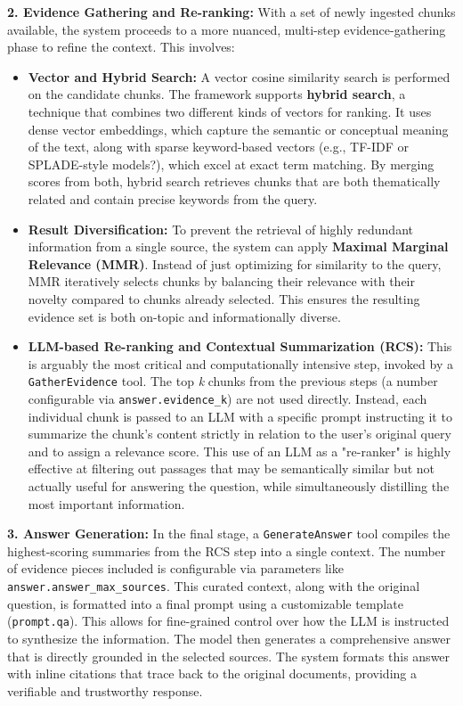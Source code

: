 \textbf{2. Evidence Gathering and Re-ranking:}
With a set of newly ingested chunks available, the system proceeds to a more nuanced, multi-step evidence-gathering phase to refine the context. This involves:
\begin{itemize}
    \item \textbf{Vector and Hybrid Search:} A vector cosine similarity search is performed on the candidate chunks. The framework supports \textbf{hybrid search}, a technique that combines two different kinds of vectors for ranking. It uses dense vector embeddings, which capture the semantic or conceptual meaning of the text, along with sparse keyword-based vectors (e.g., TF-IDF or SPLADE-style models?), which excel at exact term matching. By merging scores from both, hybrid search retrieves chunks that are both thematically related and contain precise keywords from the query. 
    \item \textbf{Result Diversification:} To prevent the retrieval of highly redundant information from a single source, the system can apply \textbf{Maximal Marginal Relevance (MMR)}. Instead of just optimizing for similarity to the query, MMR iteratively selects chunks by balancing their relevance with their novelty compared to chunks already selected. This ensures the resulting evidence set is both on-topic and informationally diverse.
    \item \textbf{LLM-based Re-ranking and Contextual Summarization (RCS):} This is arguably the most critical and computationally intensive step, invoked by a \texttt{GatherEvidence} tool. The top \textit{k} chunks from the previous steps (a number configurable via \texttt{answer.evidence\_k}) are not used directly. Instead, each individual chunk is passed to an LLM with a specific prompt instructing it to summarize the chunk's content strictly in relation to the user's original query and to assign a relevance score. This use of an LLM as a "re-ranker" is highly effective at filtering out passages that may be semantically similar but not actually useful for answering the question, while simultaneously distilling the most important information.
\end{itemize}

\textbf{3. Answer Generation:}
In the final stage, a \texttt{GenerateAnswer} tool compiles the highest-scoring summaries from the RCS step into a single context. The number of evidence pieces included is configurable via parameters like \texttt{answer.answer\_max\_sources}. This curated context, along with the original question, is formatted into a final prompt using a customizable template (\texttt{prompt.qa}). This allows for fine-grained control over how the LLM is instructed to synthesize the information. The model then generates a comprehensive answer that is directly grounded in the selected sources. The system formats this answer with inline citations that trace back to the original documents, providing a verifiable and trustworthy response.

